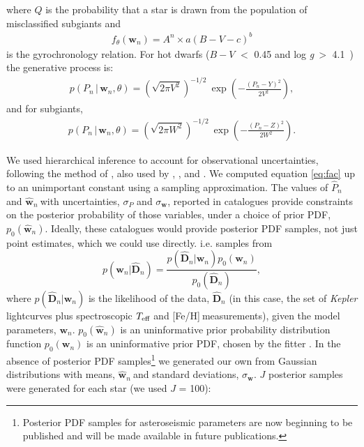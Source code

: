 \documentclass[useAMS, usenatbib]{mn2e}
\newcommand{\logg}{log \emph{g}}
\newcommand{\teff}{$T_{\rm{eff}}$}
\newcommand{\w}{\mathbf{w}}
\newcommand{\wh}{$\hat{\mathbf{w}}_n$}
\newcommand{\ph}{$\hat{P}_n$}
\newcommand{\feh}{[Fe/H]}
\newcommand{\subcut}{4.1~}
\begin{document}
where $Q$ is the probability that a star is drawn from the population of
misclassified subgiants and
\begin{eqnarray}
f_\theta(\w_n) = A^n \times a(B-V - c)^b
\end{eqnarray}
is the gyrochronology relation.
For hot dwarfs ($B-V$ $<$ 0.45 and \logg$~>$ \subcut) the generative process
is:
\begin{eqnarray}
p(P_n\,|\,\w_n,\theta) = \left(\sqrt{2\pi V^2}\right)^{-1/2}~
\exp\left({-\frac{(P_n-Y)^2}{2V^2}}\right),
\end{eqnarray}
and for subgiants,
\begin{eqnarray}
p(P_n\,|\,\w_n,\theta) = \left(\sqrt{2\pi W^2}\right)^{-1/2}~
\exp\left({-\frac{(P_n-Z)^2}{2W^2}}\right).
\end{eqnarray}

We used hierarchical inference to account for observational uncertainties,
following the method of \citet{Hogg2010}, also used by
\citet{Foreman-Mackey2014}, \citet{Rogers2014}, \citet{Morton2014} and
\citet{Demory2014}.
We computed equation \ref{eq:fac} up to an unimportant constant
using a sampling approximation.
The values of \ph$~$and \wh$~$with uncertainties, $\sigma_P$ and
$\sigma_{\mathbf{w}}$, reported in catalogues provide constraints on the
posterior probability of those variables, under a choice of prior PDF,
$p_0(\hat{\mathbf{w}}_n)$.
Ideally, these catalogues would provide posterior PDF samples, not just point
estimates, which we could use directly.
i.e. samples from
\begin{equation}
	p(\mathbf{w}_n|\hat{\mathbf{D}}_n) =
	\frac{p(\hat{\mathbf{D}}_n|\mathbf{w}_n)p_0(\mathbf{w}_n)}
	{p_0(\hat{\mathbf{D}}_n)},
\end{equation}
where $p(\hat{\mathbf{D}}_n|\w_n)$ is the likelihood of the data,
$\hat{\mathbf{D}}_n$ (in this case,
the set of {\it Kepler} lightcurves plus spectroscopic \teff$~$and
\feh$~$measurements), given the model parameters, $\mathbf{w}_n$.
$p_0(\hat{\w}_n)$ is an uninformative prior probability distribution
function $p_0(\mathbf{w}_n)$ is an uninformative prior PDF, chosen by the
fitter \citep[][used a flat prior PDF in age and \logg]{Chaplin2014}.
In the absence of posterior PDF samples\footnote{Posterior PDF samples
for asteroseismic parameters are now beginning to be published and will be made
available in future publications.} we generated our own from Gaussian
distributions with means, \wh$~$and standard deviations, $\sigma_{\mathbf{w}}$.
$J$ posterior samples were generated for each star (we used $J$ = 100):
\end{document}
